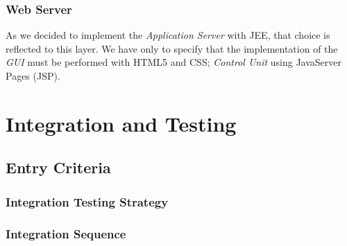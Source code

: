 \subsubsection{Web Server}
As we decided to implement the \textit{Application Server} with JEE, that choice is reflected to this layer. We have only to specify that the implementation of the \textit{GUI} must be performed with HTML5 and CSS; \textit{Control Unit} using JavaServer Pages (JSP).


\section{Integration and Testing}\label{int_test}

\subsection{Entry Criteria}

\subsubsection{Integration Testing Strategy}

\subsubsection{Integration Sequence}
